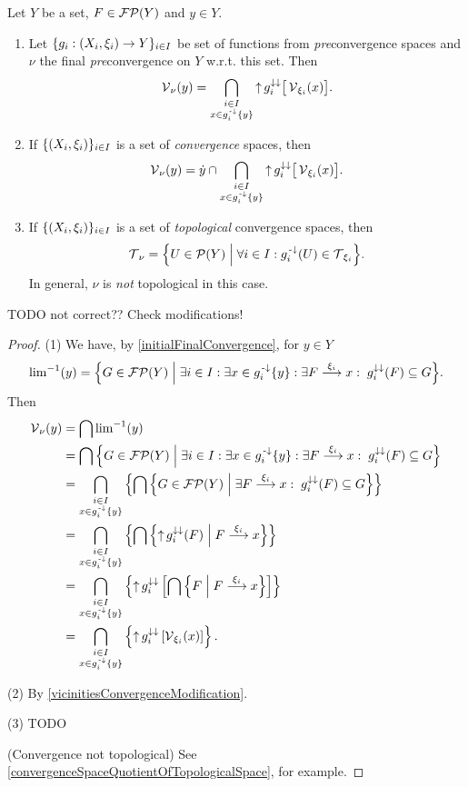 \begin{proposition} \label{pretopologicalFinalConvergence}
Let $Y$ be a set, $F\in \operatorname{\mathcal{FP}}(Y)$ and $y\in Y$.
\begin{enumerate}
\item Let $\{g_i: \left( X_i, \xi_i \right) \to Y\}_{i\in I}$ be set of functions from \emph{pre}convergence spaces and $\nu$ the final \emph{pre}convergence on $Y$ w.r.t. this set. Then 
\[ \operatorname{\mathcal{V}}_\nu(y) = \bigcap_{\substack{i\in I \\ x\in g^{\text{\hspace{0.15em}-}\downarrow}_i\{y\}}}\operatorname{\uparrow} g_i^{\downarrow\downarrow}\big[\operatorname{\mathcal{V}}_{\xi_i}(x)\big]. \]
\item If $\{\left( X_i, \xi_i \right)\}_{i\in I}$ is a set of \emph{convergence} spaces, then
\[ \operatorname{\mathcal{V}}_\nu(y) = \dot{y} \cap \bigcap_{\substack{i\in I \\ x\in g^{\text{\hspace{0.15em}-}\downarrow}_i\{y\}}}\operatorname{\uparrow} g_i^{\downarrow\downarrow}\big[\operatorname{\mathcal{V}}_{\xi_i}(x)\big]. \]
\item If $\{\left( X_i, \xi_i \right)\}_{i\in I}$ is a set of \emph{topological} convergence spaces, then
\[ \topology_\nu = \setbuilder{U\in\powerset(Y)}{\forall i\in I: g_i^{\preimf}(U)\in\topology_{\xi_i}}. \]
In general, $\nu$ is \emph{not} topological in this case.
\end{enumerate}
\end{proposition}
TODO not correct?? Check modifications!
\begin{proof}
(1) We have, by \ref{initialFinalConvergence}, for $y\in Y$
\[ {\lim}^{-1}(y) = \setbuilder{G\in\powerfilters(Y)}{\exists i\in I: \exists x\in g_i^\preimf\{y\}: \exists F\overset{\xi_i}{\longrightarrow}x:\; g_i^{\imf\imf}(F)\subseteq G}. \]
Then
\begin{align*}
\vicinity_\nu(y) &= \bigcap {\lim}^{-1}(y) \\
&= \bigcap \setbuilder{G\in\powerfilters(Y)}{\exists i\in I: \exists x\in g_i^\preimf\{y\}: \exists F\overset{\xi_i}{\longrightarrow}x:\; g_i^{\imf\imf}(F)\subseteq G} \\
&= \bigcap_{\substack{i\in I \\ x\in g^\preimf_i\{y\}}} \left\{ \bigcap\setbuilder{G\in\powerfilters(Y)}{\exists F\overset{\xi_i}{\longrightarrow}x:\; g_i^{\imf\imf}(F)\subseteq G} \right\} \\
&= \bigcap_{\substack{i\in I \\ x\in g^\preimf_i\{y\}}} \left\{ \bigcap\setbuilder{\upset g_i^{\imf\imf}(F)}{F\overset{\xi_i}{\longrightarrow}x} \right\} \\
&= \bigcap_{\substack{i\in I \\ x\in g^\preimf_i\{y\}}} \left\{ \upset g_i^{\imf\imf}\left[\bigcap\setbuilder{F}{F\overset{\xi_i}{\longrightarrow}x}\right] \right\} \\
&= \bigcap_{\substack{i\in I \\ x\in g^\preimf_i\{y\}}} \left\{ \upset g_i^{\imf\imf}\left[\vicinity_{\xi_i}(x)\right] \right\}.
\end{align*}

(2) By \ref{vicinitiesConvergenceModification}.

(3) TODO

(Convergence not topological) See \ref{convergenceSpaceQuotientOfTopologicalSpace}, for example.
\end{proof}

